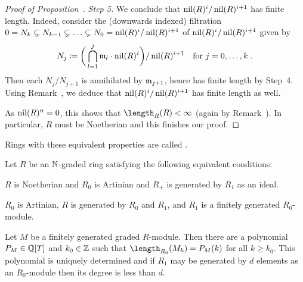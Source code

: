 \documentclass[a4paper,parskip=half,numbers=enddot, DIV=12, headheight=30pt]{scrreprt}
\begin{document}
\begin{proof}[Proof of Proposition~]
    \emph{Step 5.} We conclude that $\operatorname{nil}(R)^i/\operatorname{nil}(R)^{i+1}$ has finite length. Indeed, consider the (downwards indexed) filtration $0=N_k\subsetneq N_{k-1}\subsetneq \ldots\subsetneq N_0=\operatorname{nil}(R)^i/\operatorname{nil}(R)^{i+1}$ of $\operatorname{nil}(R)^i/\operatorname{nil}(R)^{i+1}$ given by
    \begin{align*}
        N_j\coloneqq\bigg(\bigcap_{l=1}^j\mathfrak{m}_l\cdot\operatorname{nil}(R)^i\bigg) /\operatorname{nil}(R)^{i+1}\quad\text{for }j=0,\ldots,k\;.
    \end{align*}
    Then each $N_j/N_{j+1}$  is annihilated by $\mathfrak{m}_{j+1}$, hence has finite length by Step~4.  Using Remark~, we deduce that $\operatorname{nil}(R)^i/\operatorname{nil}(R)^{i+1}$ has finite length as well.
    
    As $\operatorname{nil}(R)^n=0$, this shows that $\length_R(R) <\infty$ (again by Remark~). In particular, $R$ must be Noetherian and this finishes our proof.
\end{proof}

\begin{defi}[Artinian]
    Rings with these equivalent properties are called .
\end{defi}
\begin{thm}
    Let $R$ be an $\mathbb{N}$-graded ring satisfying the following equivalent conditions:
    \begin{alphanumerate}
    \item 
        $R$ is Noetherian and $R_0$ is Artinian and $R_+$ is generated by $R_1$ as an ideal.
    \item 
        $R_0$ is Artinian, $R$ is generated by $R_0$ and $R_1$, and $R_1$ is a finitely generated $R_0$-module.
    \end{alphanumerate}
    Let $M$ be a finitely generated graded $R$-module. Then there are a polynomial $P_M\in \mathbb{Q}[T]$ and $k_0\in\mathbb{Z}$ such that $\length_{R_0}(M_k) = P_M(k)$ for all $k\geq k_0$. This polynomial is uniquely determined and if $R_1$ may be generated by $d$ elements as an $R_0$-module then its degree is less than $d$.
\end{thm}
\end{document}
